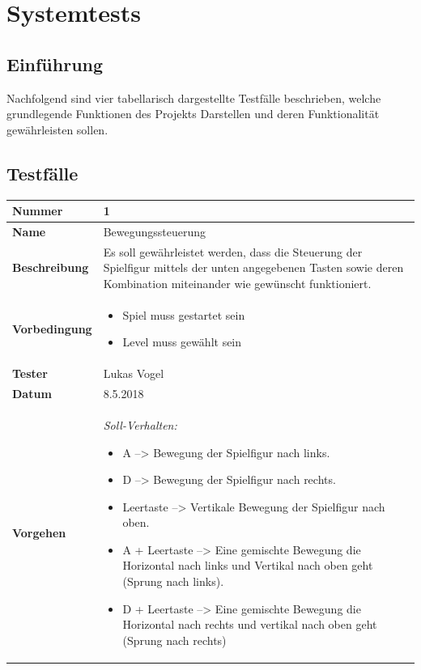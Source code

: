 \section{Systemtests} 
\subsection{Einführung}
Nachfolgend sind vier tabellarisch dargestellte Testfälle beschrieben, welche grundlegende Funktionen des Projekts Darstellen und deren Funktionalität gewährleisten sollen.
\subsection{Testfälle}
\def \currentAuthor {Lukas Vogel}
\begin{table}
	
\renewcommand{\arraystretch}{1.5}
\begin{tabular}{|p{3.5cm}|p{11cm}|}
	
	\hline 
	\textbf{Nummer} & 1 \\ 
	\hline 
	\textbf{Name} & {\large Bewegungssteuerung} \\ 
	\hline 
	\textbf{Beschreibung} & 
	Es soll gewährleistet werden, dass die Steuerung der Spielfigur mittels der unten angegebenen Tasten sowie deren Kombination miteinander wie gewünscht funktioniert.  \\ 
	\hline 
	\textbf{Vorbedingung} & 
	\begin{itemize}
		\setlength{\itemsep}{1pt}
		\setlength{\parskip}{0.5pt}
		\item Spiel muss gestartet sein
		\item Level muss gewählt sein
	\end{itemize} \\ 
	\hline 
	\textbf{Tester} & Lukas Vogel \\ 
	\hline 
	\textbf{Datum} & 8.5.2018 \\ 
	\hline 
	\textbf{Vorgehen} & 
	\textit{Soll-Verhalten:}
	\begin{itemize}
		\setlength{\itemsep}{1pt}
		\setlength{\parskip}{0.5pt}
		\item A --> Bewegung der Spielfigur nach links.
		\item D --> Bewegung der Spielfigur nach rechts.
		\item Leertaste --> Vertikale Bewegung der Spielfigur nach oben.
		\item A + Leertaste --> Eine gemischte Bewegung die Horizontal nach links und Vertikal nach oben geht (Sprung nach links).
		\item D + Leertaste --> Eine gemischte Bewegung die Horizontal nach rechts und vertikal nach oben geht (Sprung nach rechts) \newline
	\end{itemize}  
	

\end{tabular}
\end{table}
